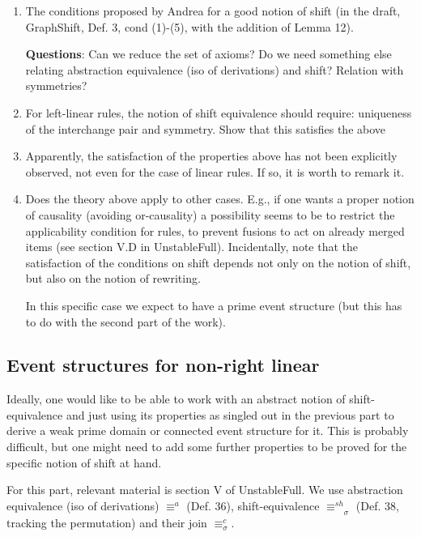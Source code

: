 \documentclass{llncs}
\newcommand{\shifteq}[1][]{\ensuremath{\mathrel{{\equiv}^\mathit{sh}_{#1}}}}
\begin{document}
\begin{enumerate}
\item The conditions proposed by Andrea for a good notion of shift (in
  the draft, GraphShift, Def. 3, cond (1)-(5), with the addition of
  Lemma 12).
  
  \textbf{Questions}: Can we reduce the set of axioms? Do we need
  something else relating abstraction equivalence (iso of derivations)
  and shift? Relation with symmetries?

  
  
\item For left-linear rules, the notion of shift equivalence should
  require: uniqueness of the interchange pair and symmetry. Show that
  this satisfies the above

\item Apparently, the satisfaction of the properties above has not
  been explicitly observed, not even for the case of linear rules. If
  so, it is worth to remark it.

\item Does the theory above apply to other cases. E.g., if one wants a
  proper notion of causality (avoiding or-causality) a possibility
  seems to be to restrict the applicability condition for rules, to
  prevent fusions to act on already merged items (see section V.D in
  UnstableFull). Incidentally, note that the satisfaction of the
  conditions on shift depends not only on the notion of shift, but
  also on the notion of rewriting.

  In this specific case we expect to have a prime event structure (but
  this has to do with the second part of the work).
  
  
\end{enumerate}


\subsection*{Event structures for non-right linear}


Ideally, one would like to be able to work with an abstract notion of
shift-equivalence and just using its properties as singled out in the
previous part to derive a weak prime domain or connected event structure
for it. This is probably difficult, but one might need to add some
further properties to be proved for the specific notion of shift at
hand.


For this part, relevant material is section V of UnstableFull. We use abstraction equivalence (iso of derivations) $\equiv^{a}$ (Def. 36), shift-equivalence $\shifteq_\sigma$ (Def. 38, tracking the permutation) and their join $\equiv^c_\sigma$.
\end{document}
